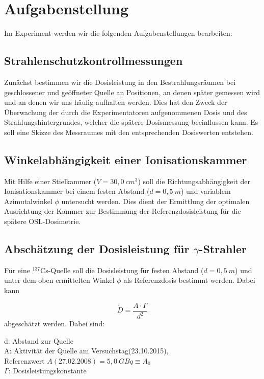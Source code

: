 \section{Aufgabenstellung}
Im Experiment werden wir die folgenden Aufgabenstellungen bearbeiten:
\subsection{Strahlenschutzkontrollmessungen}
Zunächst bestimmen wir die Dosisleistung in den Bestrahlungsräumen bei geschlossener und geöffneter Quelle an Positionen, an denen später gemessen wird und an denen wir uns häufig aufhalten werden. Dies hat den Zweck der Überwachung der durch die Experimentatoren aufgenommenen Dosis und des Strahlungshintergrundes, welcher die spätere Dosismessung beeinflussen kann. Es soll eine Skizze des Messraumes mit den entsprechenden Dosiswerten entstehen.

\subsection{Winkelabhängigkeit einer Ionisationskammer}
Mit Hilfe einer Stielkammer ($V = 30,0\ \unit{cm^3}$) soll die Richtungsabhängigkeit der Ionisationskammer bei einem festen Abstand ($d=0,5\ \unit{m}$) und variablem Azimutalwinkel $\phi$ untersucht werden.
Dies dient der Ermittlung der optimalen Ausrichtung der Kammer zur Bestimmung der Referenzdosisleistung für die spätere OSL-Dosimetrie.

\subsection{Abschätzung der Dosisleistung für $\gamma$-Strahler}
Für eine $^{137}$Cs-Quelle soll die Dosisleistung für festen Abstand ($d=0,5\ \unit{m}$) und unter dem oben ermittelten Winkel $\phi$ als Referenzdosis bestimmt werden. Dabei kann

\begin{equation} \label{eq:dosisleistung}
	\dot{D}=\frac{A \cdot \Gamma}{d^2}
\end{equation}
abgeschätzt werden. Dabei sind:
\begin{center}
	\begin{minipage}{.9\textwidth}
		d: Abstand zur Quelle\\
		A: Aktivität der Quelle am Versuchstag(23.10.2015), \\
		Referenzwert $A(27.02.2008) = 5,0\ \unit{GBq} \equiv A_0$\\
		$\Gamma$: Dosisleistungskonstante
	
	\end{minipage}
\end{center}

